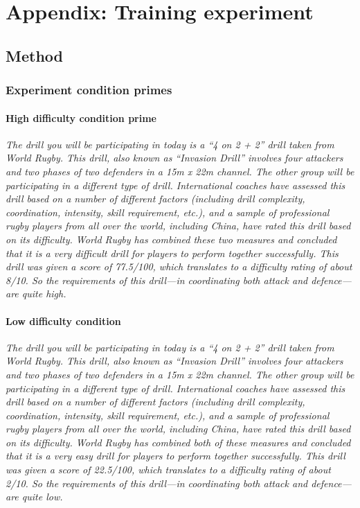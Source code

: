 \chapter{Appendix: Training experiment\label{app9:trainingExperiment}}

\section{Method\label{app9:method}}


\subsection{Experiment condition primes\label{app9:conditionPrime}}

\subsubsection{High difficulty condition prime\label{app9:conditionPrimeHigh}}
\textit{The drill you will be participating in today is a ``4 on 2 + 2'' drill taken from World Rugby.  This drill, also known as ``Invasion Drill'' involves four attackers and two phases of two defenders in a 15m x 22m channel.  The other group will be participating in a different type of drill.  International coaches have assessed this drill based on a number of different factors (including drill complexity, coordination, intensity, skill requirement, etc.), and a sample of professional rugby players from all over the world, including China, have rated this drill based on its difficulty.  World Rugby has combined these two measures and concluded that it is a very difficult drill for players to perform together successfully.  This drill was given a score of 77.5/100, which translates to a difficulty rating of about 8/10.  So the requirements of this drill—in coordinating both attack and defence—are quite high.}

\subsubsection{\label{app9:conditionPrimeLow}Low difficulty condition}
\textit{The drill you will be participating in today is a ``4 on 2 + 2'' drill taken from World Rugby.  This drill, also known as ``Invasion Drill'' involves four attackers and two phases of two defenders in a 15m x 22m channel.  The other group will be participating in a different type of drill.  International coaches have assessed this drill based on a number of different factors (including drill complexity, coordination, intensity, skill requirement, etc.), and a sample of professional rugby players from all over the world, including China, have rated this drill based on its difficulty.  World Rugby has combined both of these measures and concluded that it is a very easy drill for players to perform together successfully.  This drill was given a score of 22.5/100, which translates to a difficulty rating of about 2/10.  So the requirements of this drill—in coordinating both attack and defence—are quite low.}


